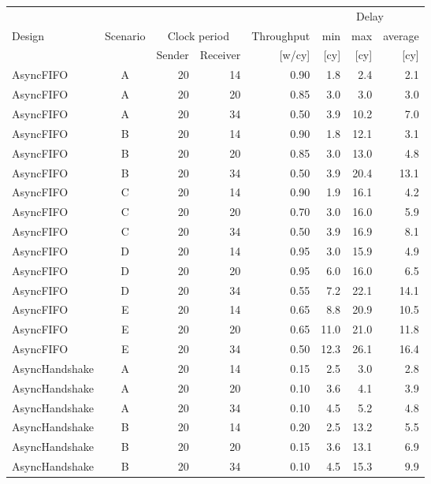 % 
% 
\begin{tabular}{lc|*{6}{r}}
  & & & & & \multicolumn{3}{c}{Delay}\\
 Design & Scenario & \multicolumn{2}{c}{Clock period} & Throughput &  min & max & average \\
  & & Sender & Receiver & [w/cy] & [cy] & [cy] & [cy] \\
\hline
 AsyncFIFO & A &  20 & 14 & 0.90  & 1.8 & 2.4 & 2.1 \\[0ex]
 AsyncFIFO & A &  20 & 20 & 0.85  & 3.0 & 3.0 & 3.0 \\[0ex]
 AsyncFIFO & A &  20 & 34 & 0.50  & 3.9 & 10.2 & 7.0 \\[0ex]
 AsyncFIFO & B &  20 & 14 & 0.90  & 1.8 & 12.1 & 3.1 \\[0ex]
 AsyncFIFO & B &  20 & 20 & 0.85  & 3.0 & 13.0 & 4.8 \\[0ex]
 AsyncFIFO & B &  20 & 34 & 0.50  & 3.9 & 20.4 & 13.1 \\[0ex]
 AsyncFIFO & C &  20 & 14 & 0.90  & 1.9 & 16.1 & 4.2 \\[0ex]
 AsyncFIFO & C &  20 & 20 & 0.70  & 3.0 & 16.0 & 5.9 \\[0ex]
 AsyncFIFO & C &  20 & 34 & 0.50  & 3.9 & 16.9 & 8.1 \\[0ex]
 AsyncFIFO & D &  20 & 14 & 0.95  & 3.0 & 15.9 & 4.9 \\[0ex]
 AsyncFIFO & D &  20 & 20 & 0.95  & 6.0 & 16.0 & 6.5 \\[0ex]
 AsyncFIFO & D &  20 & 34 & 0.55  & 7.2 & 22.1 & 14.1 \\[0ex]
 AsyncFIFO & E &  20 & 14 & 0.65  & 8.8 & 20.9 & 10.5 \\[0ex]
 AsyncFIFO & E &  20 & 20 & 0.65  & 11.0 & 21.0 & 11.8 \\[0ex]
 AsyncFIFO & E &  20 & 34 & 0.50  & 12.3 & 26.1 & 16.4 \\[0ex]
\hline
 AsyncHandshake & A &  20 & 14 & 0.15  & 2.5 & 3.0 & 2.8 \\[0ex]
 AsyncHandshake & A &  20 & 20 & 0.10  & 3.6 & 4.1 & 3.9 \\[0ex]
 AsyncHandshake & A &  20 & 34 & 0.10  & 4.5 & 5.2 & 4.8 \\[0ex]
 AsyncHandshake & B &  20 & 14 & 0.20  & 2.5 & 13.2 & 5.5 \\[0ex]
 AsyncHandshake & B &  20 & 20 & 0.15  & 3.6 & 13.1 & 6.9 \\[0ex]
 AsyncHandshake & B &  20 & 34 & 0.10  & 4.5 & 15.3 & 9.9 \\[0ex]

\end{tabular}
